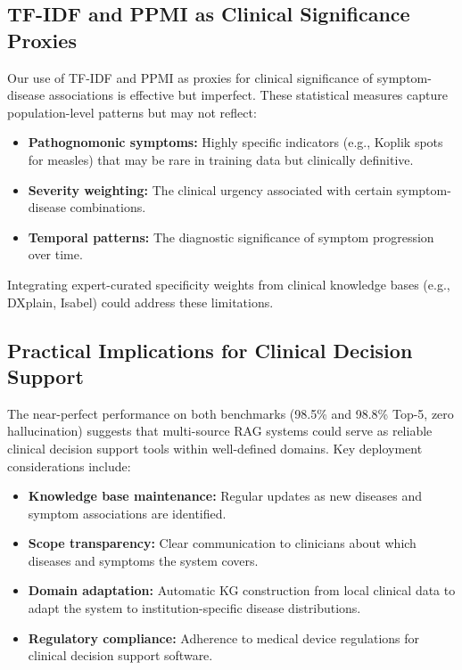\documentclass[review]{elsarticle}
\begin{document}
\subsection{TF-IDF and PPMI as Clinical Significance Proxies}

Our use of TF-IDF and PPMI as proxies for clinical significance of symptom-disease associations is effective but imperfect. These statistical measures capture population-level patterns but may not reflect:

\begin{itemize}
    \item \textbf{Pathognomonic symptoms:} Highly specific indicators (e.g., Koplik spots for measles) that may be rare in training data but clinically definitive.
    \item \textbf{Severity weighting:} The clinical urgency associated with certain symptom-disease combinations.
    \item \textbf{Temporal patterns:} The diagnostic significance of symptom progression over time.
\end{itemize}

Integrating expert-curated specificity weights from clinical knowledge bases (e.g., DXplain, Isabel) could address these limitations.

\subsection{Practical Implications for Clinical Decision Support}

The near-perfect performance on both benchmarks (98.5\% and 98.8\% Top-5, zero hallucination) suggests that multi-source RAG systems could serve as reliable clinical decision support tools within well-defined domains. Key deployment considerations include:

\begin{itemize}
    \item \textbf{Knowledge base maintenance:} Regular updates as new diseases and symptom associations are identified.
    \item \textbf{Scope transparency:} Clear communication to clinicians about which diseases and symptoms the system covers.
    \item \textbf{Domain adaptation:} Automatic KG construction from local clinical data to adapt the system to institution-specific disease distributions.
    \item \textbf{Regulatory compliance:} Adherence to medical device regulations for clinical decision support software.
\end{itemize}
\end{document}
